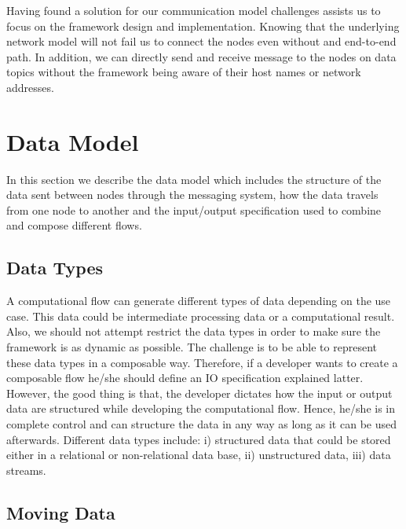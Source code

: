 \noindent Having found a solution for our communication model challenges assists us to focus on the framework design and implementation. Knowing that the underlying network model will not fail us to connect the nodes even without and end-to-end path. In addition, we can directly send and receive message to the nodes on data topics without the framework being aware of their host names or network addresses.  




\section{Data Model}
In this section we describe the data model which includes the structure of the data sent between nodes through the messaging system, how the data travels from one node to another and the input/output specification used to combine and compose different flows.

\subsection{Data Types}
A computational flow can generate different types of data depending on the use case. This data could be intermediate processing data or a computational result. Also, we should not attempt restrict the data types in order to make sure the framework is as dynamic as possible. The challenge is to be able to represent these data types in a composable way. Therefore, if a developer wants to create a composable flow he/she should define an IO specification explained latter. However, the good thing is that, the developer dictates how the input or output data are structured while developing the computational flow. Hence, he/she is in complete control and can structure the data in any way as long as it can be used afterwards.  Different data types include: i) structured data that could be stored either in a relational or non-relational data base, ii) unstructured data, iii)  data streams.

\subsection{Moving Data}

